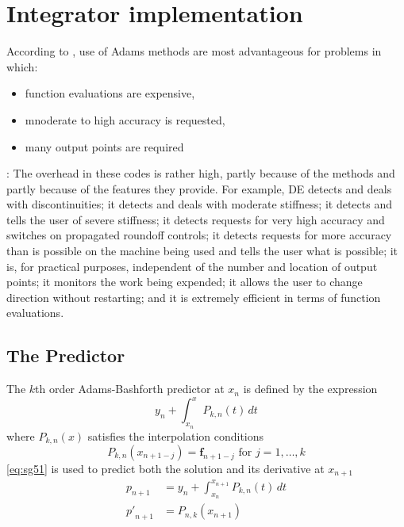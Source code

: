 \section{Integrator implementation}\label{sec:integrator-implementation}

According to \cite{Shampine1975}, use of Adams methods are most advantageous for 
problems in which:
\begin{itemize}
    \item function evaluations are expensive,
    \item mnoderate to high accuracy is requested,
    \item many output points are required
\end{itemize}

\cite{Shampine1975}:
The overhead in these codes is rather high, partly because of the methods
and partly because of the features they provide. For example, DE detects
and deals with discontinuities; it detects and deals with moderate stiffness;
it detects and tells the user of severe stiffness; it detects requests for very
high accuracy and switches on propagated roundoff controls; it detects
requests for more accuracy than is possible on the machine being used and
tells the user what is possible; it is, for practical purposes, independent
of the number and location of output points; it monitors the work being
expended; it allows the user to change direction without restarting; and
it is extremely efficient in terms of function evaluations. 

\subsection{The Predictor}\label{ssec:integrator-predictor}
The $k$th order Adams-Bashforth predictor at $x_n$ is defined by the expression 
\begin{equation}\label{eq:sg51}
  y_n + \int_{x_n}^{x} P_{k,n}(t) \,dt
\end{equation}
where $P_{k,n}(x)$ satisfies the interpolation conditions
\begin{equation}\label{eq:sg51b}
  P_{k,n}(x_{n+1-j}) = \bm{f}_{n+1-j} \text{ for } j=1,\dots ,k
\end{equation}
\autoref{eq:sg51} is used to predict both the solution and its derivative at 
$x_{n+1}$
\begin{equation}
  \begin{aligned}
    p_{n+1}    &= y_n + \int_{x_n}^{x_{n+1}}  P_{k,n} (t) \,dt \label{eq:sg52a}\\
    {p'}_{n+1} &= P_{n,k}(x_{n+1}) \label{eq:sg52b}
  \end{aligned}
\end{equation}

